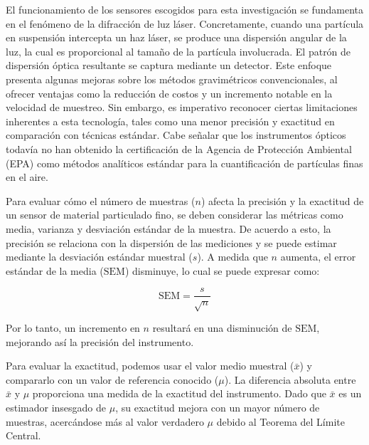 El funcionamiento de los sensores escogidos para esta investigación se fundamenta en el fenómeno de la difracción de luz láser. Concretamente, cuando una partícula en suspensión intercepta un haz láser, se produce una dispersión angular de la luz, la cual es proporcional al tamaño de la partícula involucrada. El patrón de dispersión óptica resultante se captura mediante un detector. Este enfoque presenta algunas mejoras sobre los métodos gravimétricos convencionales, al ofrecer ventajas como la reducción de costos y un incremento notable en la velocidad de muestreo. Sin embargo, es imperativo reconocer ciertas limitaciones inherentes a esta tecnología, tales como una menor precisión y exactitud en comparación con técnicas estándar. Cabe señalar que los instrumentos ópticos todavía no han obtenido la certificación de la Agencia de Protección Ambiental (EPA) como métodos analíticos estándar para la cuantificación de partículas finas en el aire.

Para evaluar cómo el número de muestras (\( n \)) afecta la precisión y la exactitud de un sensor de material particulado fino, se deben considerar las métricas como media, varianza y desviación estándar de la muestra. De acuerdo a esto, la precisión se relaciona con la dispersión de las mediciones y se puede estimar mediante la desviación estándar muestral ($s$). A medida que \( n \) aumenta, el error estándar de la media (\( \text{SEM} \)) disminuye, lo cual se puede expresar como:

\[
\text{SEM} = \frac{s}{\sqrt{n}}
\]

Por lo tanto, un incremento en \( n \) resultará en una disminución de \( \text{SEM} \), mejorando así la precisión del instrumento.

Para evaluar la exactitud, podemos usar el valor medio muestral (\( \bar{x} \)) y compararlo con un valor de referencia conocido (\( \mu \)). La diferencia absoluta entre \( \bar{x} \) y \( \mu \) proporciona una medida de la exactitud del instrumento. Dado que \( \bar{x} \) es un estimador insesgado de \( \mu \), su exactitud mejora con un mayor número de muestras, acercándose más al valor verdadero \( \mu \) debido al Teorema del Límite Central.





